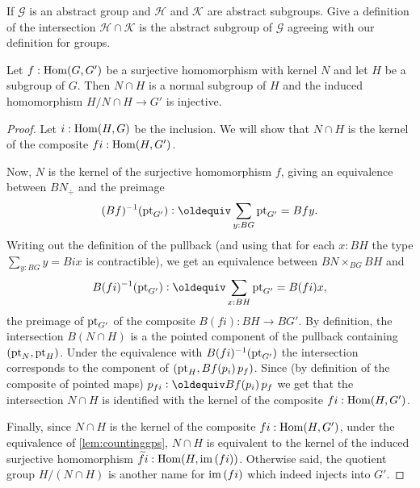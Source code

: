 \begin{xca}
  If $\mathcal G$ is an abstract group and $\mathcal H$ and $\mathcal K$ are abstract subgroups.  Give a definition of the intersection $\mathcal H\cap\mathcal K$ is the abstract subgroup of $\mathcal G$ agreeing with our definition for groups.
\end{xca}
\begin{lemma}
  \label{lem:whatSylow2needs}
  Let $f:\mathrm{Hom}(G,G')$ be a surjective homomorphism with kernel $N$ and let $H$ be a subgroup of $G$.  Then
$N\cap H$ is a normal subgroup of $H$
and the induced homomorphism $H/N\cap H\to G'$ is injective.
  \begin{proof}
Let $i:\mathrm{Hom}(H,G)$ be the inclusion.  We will show that $N\cap H$ is the kernel of the composite $fi:\mathrm{Hom}(H,G')$.  

Now, $N$ is the kernel of the surjective homomorphism $f$, giving an equivalence between $BN_\div$ and the preimage 
$$(Bf)^{-1}(\pt_{G'})\defequi\sum_{y:BG}\pt_{G'}=Bfy.$$  
Writing out the definition of the pullback (and using that for each $x:BH$ the type $\sum_{y:BG}y=Bix$ is contractible), we get an equivalence between $BN\times_{BG}BH$ and 
$$B(fi)^{-1}(\pt_{G'})\defequi\sum_{x:BH}\pt_{G'}=B(fi)x,$$  
the preimage of $\mathrm{pt}_{G'}$ of the composite $B(fi):BH\to BG'$.
 By definition, the intersection $B(N\cap H)$ is a the pointed component of the pullback containing $(\mathrm{pt}_N,\mathrm{pt}_H)$.  Under the equivalence with $B(fi)^{-1}(\mathrm{pt}_{G'})$ the intersection corresponds to the component of $(\pt_H,Bf(p_i)\,p_f)%
 $.  
Since (by definition of the composite of pointed maps) $p_{fi}\defequi Bf(p_i)\,p_f$ we get that the intersection $N\cap H$ is identified with the kernel of the composite $fi:\mathrm{Hom}(H,G')$.

Finally, since $N\cap H$ is the kernel of the composite $fi:\mathrm{Hom}(H,G')$, under the equivalence of \cref{lem:countinggps}, $N\cap H$ is equivalent to the kernel of the induced surjective homomorphism $\widetilde {fi}:\mathrm{Hom}(H,\mathrm{im}\, (fi))$.  Otherwise said, the quotient group $H/(N\cap H)$ is another name for $\mathrm{im}\, (fi)$ which indeed injects into $G'$.
  \end{proof}
\end{lemma}


